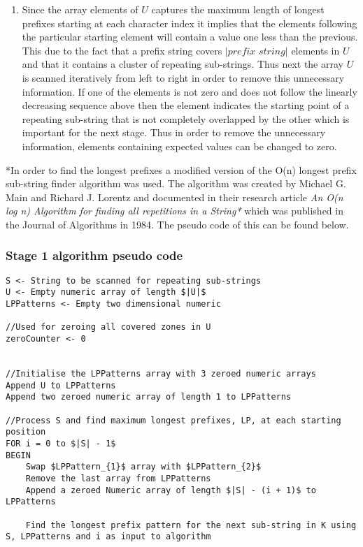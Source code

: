 \documentclass[12pt]{article}
\begin{document}
\begin{flushleft}
\begin{enumerate}
		\item Since the array elements of $U$ captures the maximum length of longest prefixes starting at each character index it implies that the elements following the particular starting element will contain a value one less than the previous. This due to the fact that a prefix string covers $|\textit{prefix string}|$ elements in $U$ and that it contains a cluster of repeating sub-strings. Thus next the array $U$ is scanned iteratively from left to right in order to remove this unnecessary information. If one of the elements is not zero and does not follow the linearly decreasing sequence above then the element indicates the starting point of a repeating sub-string that is not completely overlapped by the other which is important for the next stage. Thus in order to remove the unnecessary information, elements containing expected values can be changed to zero.
		
		\end{enumerate}
				  
		*In order to find the longest prefixes a modified version of the O(n) longest prefix sub-string finder algorithm was used. The algorithm was created by Michael G. Main and Richard J. Lorentz and documented in their research article \textit{An O(n log n) Algorithm for finding all repetitions in a String*} which was published in the Journal of Algorithms in 1984. The pseudo code of this can be found below.\\
		\newpage
		\subsubsection{Stage 1 algorithm pseudo code}
\begin{lstlisting}
S <- String to be scanned for repeating sub-strings
U <- Empty numeric array of length $|U|$
LPPatterns <- Empty two dimensional numeric

//Used for zeroing all covered zones in U
zeroCounter <- 0 
 

//Initialise the LPPatterns array with 3 zeroed numeric arrays
Append U to LPPatterns 
Append two zeroed numeric array of length 1 to LPPatterns

//Process S and find maximum longest prefixes, LP, at each starting position
FOR i = 0 to $|S| - 1$
BEGIN
	Swap $LPPattern_{1}$ array with $LPPattern_{2}$
	Remove the last array from LPPatterns    
	Append a zeroed Numeric array of length $|S| - (i + 1)$ to LPPatterns
	
	Find the longest prefix pattern for the next sub-string in K using S, LPPatterns and i as input to algorithm
	

\end{lstlisting}
\end{flushleft}
\end{document}
